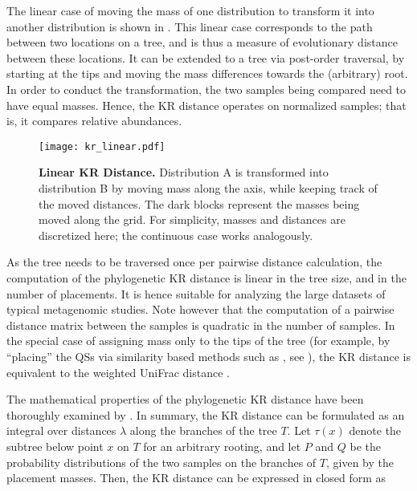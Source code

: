 The linear case of moving the mass of one distribution to transform it into another distribution
is shown in .
This linear case corresponds to the path between two locations on a tree,
and is thus a measure of evolutionary distance between these locations.
It can be extended to a tree via post-order traversal,
by starting at the tips and moving the mass differences towards the (arbitrary) root.
In order to conduct the transformation, the two samples being compared need to have equal masses.
Hence, the KR distance operates on normalized samples; that is, it compares relative abundances.

\begin{figure}[!htb]
    \centering
    \texttt{[image: kr\_linear.pdf]}
    \caption[Linear KR Distance]{
        \textbf{Linear KR Distance.}
        Distribution A is transformed into distribution B by moving mass along the axis,
        while keeping track of the moved distances.
        The dark blocks represent the masses being moved along the grid.
        For simplicity, masses and distances are discretized here; the continuous case works analogously.
    }
    \label{fig:kr_linear}
\end{figure}

As the tree needs to be traversed once per pairwise distance calculation,
the computation of the phylogenetic KR distance is linear in the tree size, and in the number of placements.
It is hence suitable for analyzing the large datasets of typical metagenomic studies.
Note however that the computation of a pairwise distance matrix between the samples is quadratic in the number of samples.
In the special case of assigning mass only to the tips of the tree
(for example, by ``placing'' the \acp{QS} via similarity based methods such as , see ),
the KR distance is equivalent to the weighted UniFrac distance \cite{Evans2012}.

The mathematical properties of the phylogenetic KR distance
have been thoroughly examined by . %
In summary, the KR distance can be formulated as an integral over distances $\lambda$ along the branches of the tree $T$.
Let $\tau(x)$ denote the subtree below point $x$ on $T$ for an arbitrary rooting,
and let $P$ and $Q$ be the probability distributions of the two samples on the branches of $T$,
given by the placement masses.
Then, the KR distance can be expressed in closed form as

